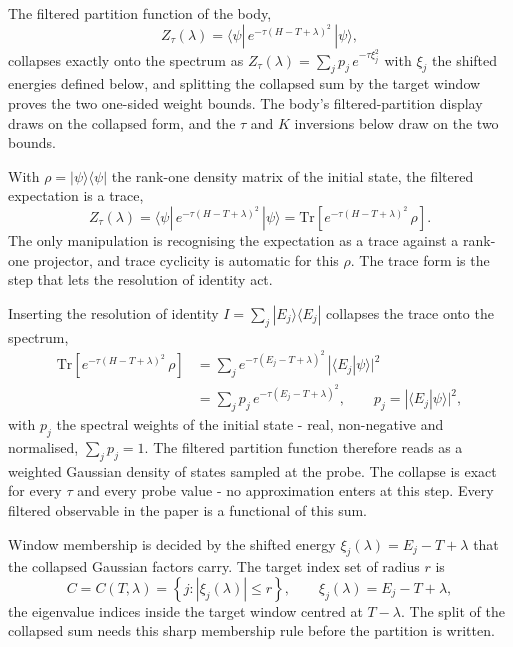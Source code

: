The filtered partition function of the body,
\begin{equation*}
Z_\tau(\lambda) = \langle \psi | \, e^{-\tau (H - T + \lambda)^2} \, | \psi \rangle ,
\end{equation*}
collapses exactly onto the spectrum as $Z_\tau(\lambda) = \sum_j p_j \, e^{-\tau \xi_j^2}$ with $\xi_j$ the shifted energies defined below, and splitting the collapsed sum by the target window proves the two one-sided weight bounds. The body's filtered-partition display draws on the collapsed form, and the $\tau$ and $K$ inversions below draw on the two bounds.

With $\rho = |\psi\rangle\langle\psi|$ the rank-one density matrix of the initial state, the filtered expectation is a trace,
\begin{equation*}
Z_\tau(\lambda) = \langle \psi | \, e^{-\tau (H - T + \lambda)^2} \, | \psi \rangle
= \mathrm{Tr}\!\left[ e^{-\tau (H - T + \lambda)^2} \, \rho \right] .
\end{equation*}
The only manipulation is recognising the expectation as a trace against a rank-one projector, and trace cyclicity is automatic for this $\rho$. The trace form is the step that lets the resolution of identity act.

Inserting the resolution of identity $I = \sum_j |E_j\rangle\langle E_j|$ collapses the trace onto the spectrum,
\begin{align*}
\mathrm{Tr}\!\left[ e^{-\tau (H - T + \lambda)^2} \, \rho \right]
&= \sum_j e^{-\tau (E_j - T + \lambda)^2} \, |\langle E_j | \psi \rangle|^2 \\
&= \sum_j p_j \, e^{-\tau (E_j - T + \lambda)^2} , \qquad p_j = |\langle E_j | \psi \rangle|^2 ,
\end{align*}
with $p_j$ the spectral weights of the initial state - real, non-negative and normalised, $\sum_j p_j = 1$. The filtered partition function therefore reads as a weighted Gaussian density of states sampled at the probe. The collapse is exact for every $\tau$ and every probe value - no approximation enters at this step. Every filtered observable in the paper is a functional of this sum.

Window membership is decided by the shifted energy $\xi_j(\lambda) = E_j - T + \lambda$ that the collapsed Gaussian factors carry. The target index set of radius $r$ is
\begin{equation}\label{def:target-index-set}
C = C(T, \lambda) = \left\{ j : |\xi_j(\lambda)| \le r \right\} , \qquad \xi_j(\lambda) = E_j - T + \lambda ,
\end{equation}
the eigenvalue indices inside the target window centred at $T - \lambda$. The split of the collapsed sum needs this sharp membership rule before the partition is written.

